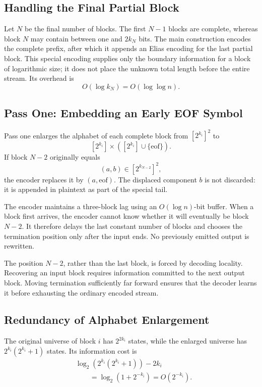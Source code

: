 \subsection{Handling the Final Partial Block}

Let \(N\) be the final number of blocks. The first \(N-1\) blocks are
complete, whereas block \(N\) may contain between one and \(2k_N\) bits.
The main construction encodes the complete prefix, after which it appends an
Elias encoding for the last partial block. This special encoding supplies
only the boundary information for a block of logarithmic size; it does not
place the unknown total length before the entire stream. Its overhead is
\[
    O(\log k_N)=O(\log\log n).
\]

\subsection{Pass One: Embedding an Early EOF Symbol}

Pass one enlarges the alphabet of each complete block from
\([2^{k_i}]^2\) to
\[
    [2^{k_i}]
    \times
    \left([2^{k_i}]\cup\{\mathrm{eof}\}\right).
\]
If block \(N-2\) originally equals
\[
    (a,b)\in[2^{k_{N-2}}]^2,
\]
the encoder replaces it by \((a,\mathrm{eof})\). The displaced component
\(b\) is not discarded: it is appended in plaintext as part of the special
tail.

The encoder maintains a three-block lag using an \(O(\log n)\)-bit buffer.
When a block first arrives, the encoder cannot know whether it will
eventually be block \(N-2\). It therefore delays the last constant number of
blocks and chooses the termination position only after the input ends. No
previously emitted output is rewritten.

The position \(N-2\), rather than the last block, is forced by decoding
locality. Recovering an input block requires information committed to the
next output block. Moving termination sufficiently far forward ensures that
the decoder learns it before exhausting the ordinary encoded stream.

\subsection{Redundancy of Alphabet Enlargement}

The original universe of block \(i\) has \(2^{2k_i}\) states, while the
enlarged universe has \(2^{k_i}(2^{k_i}+1)\) states. Its information cost is
\[
\begin{aligned}
    &\log_2\left(2^{k_i}(2^{k_i}+1)\right)-2k_i\\
    &\qquad=\log_2(1+2^{-k_i})
    =O(2^{-k_i}).
\end{aligned}
\]

